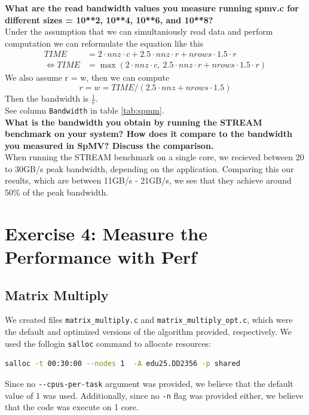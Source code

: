 \documentclass[a4paper,10pt]{article}
\begin{document}
\textbf{What are the read bandwidth values you measure running spmv.c for different sizes  = 10**2, 10**4, 10**6, and 10**8?}\\
Under the assumption that we can simultaniously read data and perform computation we can reformulate the equation like this
\begin{align*}
TIME &= 2 \cdot nnz \cdot c + 2.5 \cdot nnz \cdot r + nrows \cdot 1.5 \cdot r\\
\Leftrightarrow TIME &= \max(2 \cdot nnz \cdot c,\ 2.5 \cdot nnz \cdot r + nrows \cdot 1.5 \cdot r)
\end{align*}
We also assume r = w, then we can compute
$$r = w = TIME / (2.5 \cdot nnz + nrows \cdot 1.5)$$
Then the bandwidth is \(\frac{1}{r}\).\\
See column \verb|Bandwidth| in table \ref{tab:spmm}.\\

\textbf{What is the bandwidth you obtain by running the STREAM benchmark on your system? How does it compare to the bandwidth you measured in SpMV? Discuss the comparison.}\\
When running the STREAM benchmark on a single core, we recieved between 20 to 30GB/s peak bandwidth, depending on the application.
Comparing this our results, which are between 11GB/s - 21GB/s, we see that they achieve around 50\% of the peak bandwidth.

\section{Exercise 4: Measure the Performance with Perf}
\subsection{Matrix Multiply}
\label{sec:matrix_multiply}
We created files \verb|matrix_multiply.c| and \verb|matrix_multiply_opt.c|, which were the default and optimized versions of the algorithm provided, respectively. We used the follogin \verb|salloc| command to allocate resources: 

\begin{lstlisting}[language=bash,basicstyle=\ttfamily]
salloc -t 00:30:00 --nodes 1  -A edu25.DD2356 -p shared
\end{lstlisting}
Since no \verb|--cpus-per-task| argument was provided, we believe that the default value of 1 was used. Additionally, since no \verb|-n| flag was provided either, we believe that the code was execute on 1 core. 
\end{document}
